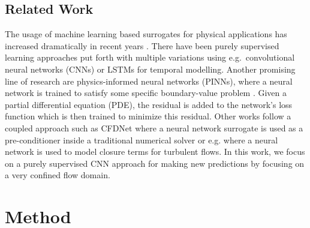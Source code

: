 \documentclass{article} %
\begin{document}
\subsection*{Related Work}
The usage of machine learning based surrogates for physical applications has increased dramatically in recent years \citep{Vinuesa2021,Chen2021,Zhu2019}.
There have been purely supervised learning approaches put forth \citep{nn_pde_data} with multiple variations using e.g.\ convolutional neural networks (CNNs) \citep{nn_pde_cnn, Thuerey2019} or LSTMs \citep{dl_lstm} for temporal modelling.
Another promising line of research are physics-informed neural networks (PINNs), where a neural network is trained to satisfy some specific boundary-value problem \citep{pinn,pinn_subsurface,pinn_hfm,pinn_pathologies,Gao2021}. 
Given a partial differential equation (PDE), the residual is added to the network's loss function which is then trained to minimize this residual.
Other works follow a coupled approach such as CFDNet \citep{cfdnet} where a neural network surrogate is used as a pre-conditioner inside a traditional numerical solver or e.g. \citet{BECK2019108910} where a neural network is used to model closure terms for turbulent flows.
In this work, we focus on a purely supervised CNN approach for making new predictions by focusing on a very confined flow domain.


\section{Method}
\label{sec:method}


\end{document}
